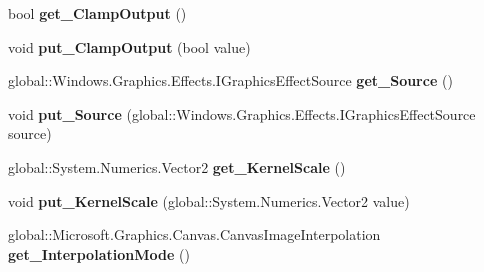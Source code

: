 \begin{DoxyCompactItemize}
bool {\bfseries get\+\_\+\+Clamp\+Output} ()
\item 
\mbox{\label{interface_microsoft_1_1_graphics_1_1_canvas_1_1_effects_1_1_i_convolve_matrix_effect_a0370614326a36da6fcf0fc7c69ba9ce2}} 
void {\bfseries put\+\_\+\+Clamp\+Output} (bool value)
\item 
\mbox{\label{interface_microsoft_1_1_graphics_1_1_canvas_1_1_effects_1_1_i_convolve_matrix_effect_a3db9cc0d5d797ce3307cc5f93aac58c3}} 
global\+::\+Windows.\+Graphics.\+Effects.\+I\+Graphics\+Effect\+Source {\bfseries get\+\_\+\+Source} ()
\item 
\mbox{\label{interface_microsoft_1_1_graphics_1_1_canvas_1_1_effects_1_1_i_convolve_matrix_effect_aa2e57e481287adea1356db1184a275e8}} 
void {\bfseries put\+\_\+\+Source} (global\+::\+Windows.\+Graphics.\+Effects.\+I\+Graphics\+Effect\+Source source)
\item 
\mbox{\label{interface_microsoft_1_1_graphics_1_1_canvas_1_1_effects_1_1_i_convolve_matrix_effect_a70e52e1ad7aa0146de7c12790467cdac}} 
global\+::\+System.\+Numerics.\+Vector2 {\bfseries get\+\_\+\+Kernel\+Scale} ()
\item 
\mbox{\label{interface_microsoft_1_1_graphics_1_1_canvas_1_1_effects_1_1_i_convolve_matrix_effect_a0b5edbc7813036ace1e989a79c0d3b5b}} 
void {\bfseries put\+\_\+\+Kernel\+Scale} (global\+::\+System.\+Numerics.\+Vector2 value)
\item 
\mbox{\label{interface_microsoft_1_1_graphics_1_1_canvas_1_1_effects_1_1_i_convolve_matrix_effect_a9ea4853f26cd360a4ee8cdd57d2ddb1e}} 
global\+::\+Microsoft.\+Graphics.\+Canvas.\+Canvas\+Image\+Interpolation {\bfseries get\+\_\+\+Interpolation\+Mode} ()
\item 
\mbox{\label{interface_microsoft_1_1_graphics_1_1_canvas_1_1_effects_1_1_i_convolve_matrix_effect_ae0a64fa71921ff52fd00b4febdbcf729}} 

\end{DoxyCompactItemize}
